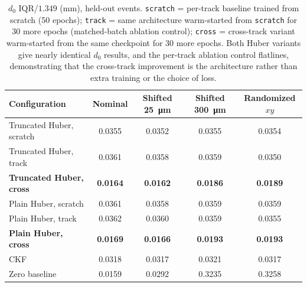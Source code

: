 \documentclass[11pt]{article}
\begin{document}
\begin{table}[h]
\centering
\caption{$d_0$ IQR/$1.349$ (mm), held-out events. \texttt{scratch} = per-track baseline trained from scratch (50 epochs); \texttt{track} = same architecture warm-started from \texttt{scratch} for 30 more epochs (matched-batch ablation control); \texttt{cross} = cross-track variant warm-started from the same checkpoint for 30 more epochs. Both Huber variants give nearly identical $d_0$ results, and the per-track ablation control flatlines, demonstrating that the cross-track improvement is the architecture rather than extra training or the choice of loss.}
\label{tab:crosstrack_matrix}
\begin{tabular}{l S[table-format=1.4] S[table-format=1.4] S[table-format=1.4] S[table-format=1.4]}
\toprule
{Configuration} & {Nominal} & {Shifted \SI{25}{\micro\metre}} & {Shifted \SI{300}{\micro\metre}} & {Randomized $xy$} \\
\midrule
Truncated Huber, scratch & 0.0355 & 0.0352 & 0.0355 & 0.0354 \\
Truncated Huber, track   & 0.0361 & 0.0358 & 0.0359 & 0.0350 \\
\textbf{Truncated Huber, cross} & \textbf{0.0164} & \textbf{0.0162} & \textbf{0.0186} & \textbf{0.0189} \\
Plain Huber, scratch     & 0.0361 & 0.0358 & 0.0359 & 0.0359 \\
Plain Huber, track       & 0.0362 & 0.0360 & 0.0359 & 0.0355 \\
\textbf{Plain Huber, cross}     & \textbf{0.0169} & \textbf{0.0166} & \textbf{0.0193} & \textbf{0.0193} \\
\midrule
CKF                      & 0.0318 & 0.0317 & 0.0321 & 0.0317 \\
Zero baseline            & 0.0159 & 0.0292 & 0.3235 & 0.3258 \\
\bottomrule
\end{tabular}
\end{table}
\end{document}
